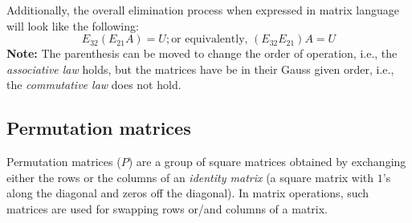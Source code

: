 \documentclass[../main.tex]{subfiles}
\begin{document}
Additionally, the overall elimination process when expressed in matrix language will look like the following:
\[
    E_{32}(E_{21}A) = U; \text{or equivalently, } (E_{32}E_{21})A = U
\]
\textbf{Note:} The parenthesis can be moved to change the order of operation, i.e., the \emph{associative law} holds, but the matrices have be in their Gauss given order, i.e., the \emph{commutative law} does not hold.


\subsection{Permutation matrices}
Permutation matrices (\(P\)) are a group of square matrices obtained by exchanging either the rows or the columns of an \emph{identity matrix} (a square matrix with \(1\)'s along the diagonal and zeros off the diagonal). In matrix operations, such matrices are used for swapping rows or/and columns of a matrix.
\end{document}

